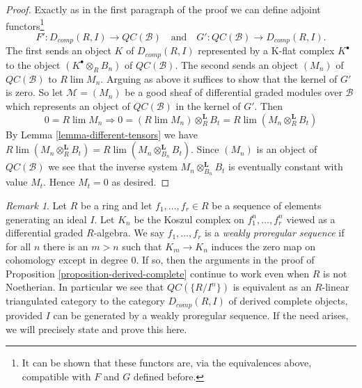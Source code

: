 \documentclass{stacks-project}
\theoremstyle{plain}
\theoremstyle{definition}
\theoremstyle{remark}
\newtheorem{remark}[subsection]{Remark}
\numberwithin{equation}{subsection}
\def\lim{\mathop{\mathrm{lim}}\nolimits}
\begin{document}
\begin{proof}
\medskip\noindent
Exactly as in the first paragraph of the proof we can define
adjoint functors\footnote{It can be shown that these functors are,
via the equivalences above, compatible with $F$ and $G$ defined before.}
$$
F' : D_{comp}(R, I) \longrightarrow \mathit{QC}(\mathcal{B})
\quad\text{and}\quad
G' : \mathit{QC}(\mathcal{B}) \longrightarrow D_{comp}(R, I).
$$
The first sends an object $K$ of $D_{comp}(R, I)$ represented by a
K-flat complex $K^\bullet$ to the object $(K^\bullet \otimes_R B_n)$
of $\mathit{QC}(\mathcal{B})$. The second sends an object
$(M_n)$ of $\mathit{QC}(\mathcal{B})$ to $R\lim M_n$.
Arguing as above it suffices to show that the kernel of $G'$ is zero.
So let $\mathcal{M} = (M_n)$ be a good sheaf of differential graded
modules over $\mathcal{B}$ which represents an object of
$\mathit{QC}(\mathcal{B})$ in the kernel of $G'$. Then
$$
0 = R\lim M_n \Rightarrow
0 = (R\lim M_n) \otimes_R^\mathbf{L} B_t =
R\lim (M_n \otimes_R^\mathbf{L} B_t)
$$
By Lemma \ref{lemma-different-tensors} we have
$R\lim (M_n \otimes_R^\mathbf{L} B_t) =
R\lim (M_n \otimes_{B_n}^\mathbf{L} B_t)$.
Since $(M_n)$ is an object of $\mathit{QC}(\mathcal{B})$ we
see that the inverse system $M_n \otimes_{B_n}^\mathbf{L} B_t$
is eventually constant with value $M_t$. Hence $M_t = 0$ as desired.
\end{proof}

\begin{remark}
\label{remark-proregular}
Let $R$ be a ring and let $f_1, \ldots, f_r \in R$ be a sequence of elements
generating an ideal $I$. Let $K_n$ be the Koszul complex on
$f_1^n, \ldots, f_r^n$ viewed as a differential graded $R$-algebra.
We say $f_1, \ldots, f_r$ is a {\it weakly proregular sequence}
if for all $n$ there is an $m > n$ such that $K_m \to K_n$
induces the zero map on cohomology except in degree $0$. If so, then
the arguments in the proof of Proposition \ref{proposition-derived-complete}
continue to work even when $R$ is not Noetherian.
In particular we see that $\mathit{QC}(\{R/I^n\})$
is equivalent as an $R$-linear triangulated category
to the category $D_{comp}(R, I)$ of derived complete objects, provided
$I$ can be generated by a weakly proregular sequence.
If the need arises, we will precisely state and prove this here.
\end{remark}












\end{document}
